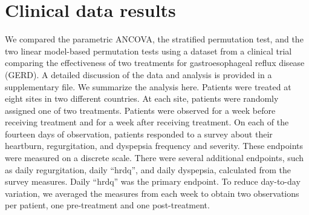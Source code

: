\documentclass[12pt]{article}
\begin{document}
%

\section{Clinical data results}\label{sec:results}
We compared the parametric ANCOVA, the stratified permutation test, and the two linear model-based permutation tests using a dataset from a clinical trial comparing the effectiveness of two treatments for gastroesophageal reflux disease (GERD).
A detailed discussion of the data and analysis is provided in a supplementary file.
We summarize the analysis here.
Patients were treated at eight sites in two different countries.
At each site, patients were randomly assigned one of two treatments.
Patients were observed for a week before receiving treatment and for a week after receiving treatment.
On each of the fourteen days of observation, patients responded to a survey about their heartburn, regurgitation, and dyspepsia frequency and severity.
These endpoints were measured on a discrete scale.
There were several additional endpoints, such as daily regurgitation, daily ``hrdq'', and daily dyspepsia, calculated from the survey measures.
Daily ``hrdq'' was the primary endpoint.
To reduce day-to-day variation, we averaged the measures from each week to obtain two observations per patient, one pre-treatment and one post-treatment.
\end{document}
